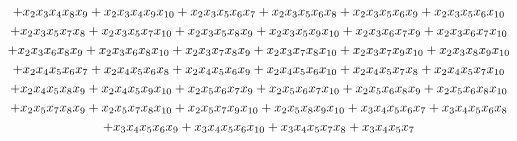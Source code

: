 \documentclass[12pt,a4paper]{article}
\theoremstyle{plain}
\theoremstyle{remark}
\newcommand{\feynpar}{x}
\begin{document}
\begin{multline}
    +\feynpar_{2} \feynpar_{3} \feynpar_{4} \feynpar_{8} \feynpar_{9}+\feynpar_{2} \feynpar_{3} \feynpar_{4} \feynpar_{9}
    \feynpar_{10}+\feynpar_{2} \feynpar_{3} \feynpar_{5} \feynpar_{6} \feynpar_{7}+\feynpar_{2} \feynpar_{3} \feynpar_{5} \feynpar_{6}
    \feynpar_{8}+\feynpar_{2} \feynpar_{3} \feynpar_{5} \feynpar_{6} \feynpar_{9}+\feynpar_{2} \feynpar_{3} \feynpar_{5} \feynpar_{6}
    \feynpar_{10}\cr
    +\feynpar_{2} \feynpar_{3} \feynpar_{5} \feynpar_{7} \feynpar_{8}+\feynpar_{2} \feynpar_{3} \feynpar_{5} \feynpar_{7}
    \feynpar_{10}+\feynpar_{2} \feynpar_{3} \feynpar_{5} \feynpar_{8} \feynpar_{9}+\feynpar_{2} \feynpar_{3} \feynpar_{5} \feynpar_{9}
    \feynpar_{10}+\feynpar_{2} \feynpar_{3} \feynpar_{6} \feynpar_{7} \feynpar_{9}+\feynpar_{2} \feynpar_{3} \feynpar_{6} \feynpar_{7}
    \feynpar_{10}\cr
    +\feynpar_{2} \feynpar_{3} \feynpar_{6} \feynpar_{8} \feynpar_{9}+\feynpar_{2} \feynpar_{3} \feynpar_{6} \feynpar_{8}
    \feynpar_{10}+\feynpar_{2} \feynpar_{3} \feynpar_{7} \feynpar_{8} \feynpar_{9}+\feynpar_{2} \feynpar_{3} \feynpar_{7} \feynpar_{8}
    \feynpar_{10}+\feynpar_{2} \feynpar_{3} \feynpar_{7} \feynpar_{9} \feynpar_{10}+\feynpar_{2} \feynpar_{3} \feynpar_{8} \feynpar_{9}
    \feynpar_{10}\cr
    +\feynpar_{2} \feynpar_{4} \feynpar_{5} \feynpar_{6} \feynpar_{7}+\feynpar_{2} \feynpar_{4} \feynpar_{5} \feynpar_{6} \feynpar_{8}+\feynpar_{2}
    \feynpar_{4} \feynpar_{5} \feynpar_{6} \feynpar_{9}+\feynpar_{2} \feynpar_{4} \feynpar_{5} \feynpar_{6} \feynpar_{10}+\feynpar_{2} \feynpar_{4}
    \feynpar_{5} \feynpar_{7} \feynpar_{8}+\feynpar_{2} \feynpar_{4} \feynpar_{5} \feynpar_{7} \feynpar_{10}\cr
    +\feynpar_{2} \feynpar_{4} \feynpar_{5} \feynpar_{8} \feynpar_{9}+\feynpar_{2} \feynpar_{4} \feynpar_{5} \feynpar_{9}
    \feynpar_{10}+\feynpar_{2} \feynpar_{5} \feynpar_{6} \feynpar_{7} \feynpar_{9}+\feynpar_{2} \feynpar_{5} \feynpar_{6} \feynpar_{7}
    \feynpar_{10}+\feynpar_{2} \feynpar_{5} \feynpar_{6} \feynpar_{8} \feynpar_{9}+\feynpar_{2} \feynpar_{5} \feynpar_{6} \feynpar_{8}
    \feynpar_{10}\cr
    +\feynpar_{2} \feynpar_{5} \feynpar_{7} \feynpar_{8} \feynpar_{9}+\feynpar_{2} \feynpar_{5} \feynpar_{7} \feynpar_{8}
    \feynpar_{10}+\feynpar_{2} \feynpar_{5} \feynpar_{7} \feynpar_{9} \feynpar_{10}+\feynpar_{2} \feynpar_{5} \feynpar_{8} \feynpar_{9}
    \feynpar_{10}+\feynpar_{3} \feynpar_{4} \feynpar_{5} \feynpar_{6} \feynpar_{7}+\feynpar_{3} \feynpar_{4} \feynpar_{5} \feynpar_{6}
    \feynpar_{8}\cr
    +\feynpar_{3} \feynpar_{4} \feynpar_{5} \feynpar_{6} \feynpar_{9}+\feynpar_{3} \feynpar_{4} \feynpar_{5} \feynpar_{6}
    \feynpar_{10}+\feynpar_{3} \feynpar_{4} \feynpar_{5} \feynpar_{7} \feynpar_{8}+\feynpar_{3} \feynpar_{4} \feynpar_{5} \feynpar_{7}

\end{multline}
\end{document}
